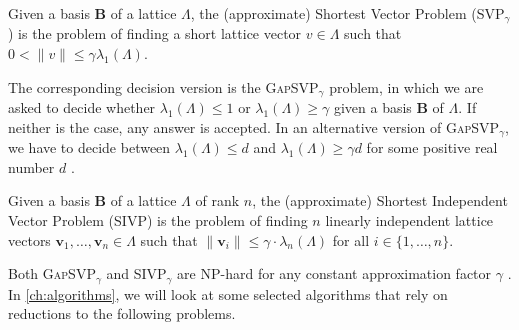 \begin{definition} \label{def:svp}
    Given a basis $\mathbf{B}$ of a lattice $\Lambda$, the (approximate) Shortest Vector Problem (SVP$_\gamma$) is the problem of finding a short lattice vector $v\in \Lambda$ such that $0 < \| v \| \leq \gamma \lambda_1(\Lambda)$.
\end{definition}

The corresponding decision version is the \textsc{GapSVP}$_\gamma$ problem, in which we are asked to decide whether $\lambda_1(\Lambda) \leq 1$ or $\lambda_1(\Lambda) \geq \gamma$ given a basis $\mathbf{B}$ of $\Lambda$. If neither is the case, any answer is accepted. In an alternative version of \textsc{GapSVP}$_\gamma$, we have to decide between $\lambda_1(\Lambda) \leq d$ and $\lambda_1(\Lambda) \geq \gamma d$ for some positive real number $d$ \cite{LM09}.

\begin{definition} \label{def:sivp}
    Given a basis $\mathbf{B}$ of a lattice $\Lambda$ of rank $n$, the (approximate) Shortest Independent Vector Problem (SIVP) is the problem of finding $n$ linearly independent lattice vectors $\mathbf{v}_1, \ldots, \mathbf{v}_n \in \Lambda$ such that $\|\mathbf{v}_i\| \leq \gamma \cdot \lambda_n(\Lambda)$ for all $i \in \{1, \ldots, n\}$.
\end{definition}

Both \textsc{GapSVP}$_\gamma$ and \textsc{SIVP}$_\gamma$ are NP-hard for any constant approximation factor $\gamma$ \cite{Khot05,BS99}. %
In \cref{ch:algorithms}, we will look at some selected algorithms that rely on reductions to the following problems.




